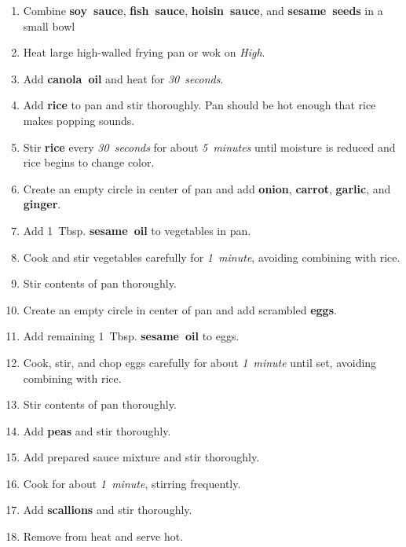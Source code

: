\documentclass[11pt,letterpaper]{article}
\begin{document}
\begin{enumerate}
	\item Combine \textbf{soy~sauce}, \textbf{fish~sauce}, \textbf{hoisin~sauce}, and \textbf{sesame~seeds} in a small bowl
    \item Heat large high-walled frying pan or wok on \textit{High}.
    \item Add \textbf{canola~oil} and heat for \textit{30~seconds}.
    \item Add \textbf{rice} to pan and stir thoroughly. Pan should be hot enough that rice makes popping sounds.
    \item Stir \textbf{rice} every \textit{30~seconds} for about \textit{5~minutes} until moisture is reduced and rice begins to change color.
    \item Create an empty circle in center of pan and add \textbf{onion}, \textbf{carrot}, \textbf{garlic}, and \textbf{ginger}.
    \item Add 1~Tbsp. \textbf{sesame~oil} to vegetables in pan.
    \item Cook and stir vegetables carefully for \textit{1~minute}, avoiding combining with rice.
    \item Stir contents of pan thoroughly.
    \item Create an empty circle in center of pan and add scrambled \textbf{eggs}.
    \item Add remaining 1~Tbsp. \textbf{sesame~oil} to eggs.
    \item Cook, stir, and chop eggs carefully for about \textit{1~minute} until set, avoiding combining with rice.
    \item Stir contents of pan thoroughly.
    \item Add \textbf{peas} and stir thoroughly.
    \item Add prepared sauce mixture and stir thoroughly.
    \item Cook for about \textit{1~minute}, stirring frequently.
    \item Add \textbf{scallions} and stir thoroughly.
    \item Remove from heat and serve hot.
\end{enumerate}
\end{document}
